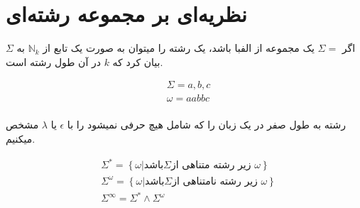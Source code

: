 \chapter{نظریه‌ای بر مجموعه رشته‌ای}
اگر
$\Sigma =$
یک مجموعه از الفبا باشد،
یک رشته را میتوان به صورت یک تابع از 
$\mathbb{N}_k$
به
$\Sigma$
بیان کرد که
$k$
در آن طول رشته است.

\begin{align*}
    &\Sigma = {a, b, c}\\
    &\omega = aabbc\\
\end{align*}

رشته به طول صفر در یک زبان را که شامل هیچ حرفی نمیشود را با 
$\epsilon$
یا
$\lambda$
مشخص میکنیم.

\begin{align*}
    &\Sigma^* = \left\{ \omega |\text{باشد}\Sigma \text{زیر رشته متناهی از }\omega \right\}\\
    &\Sigma^\omega = \left\{ \omega |\text{باشد}\Sigma \text{زیر رشته نامتناهی از }\omega \right\}\\
    &\Sigma^\infty = \Sigma^* \wedge \Sigma^\omega
\end{align*}